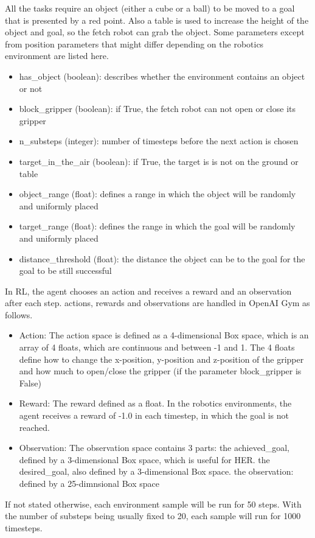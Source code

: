 \vspace{0.5cm}

All the tasks require an object (either a cube or a ball) to be moved to a goal that is presented by a red point. Also a table is used to increase the height of the object and goal, so the fetch robot can grab the object.
Some parameters except from position parameters that might differ depending on the robotics environment are listed here.

\begin{itemize}
	\item has\_object (boolean): describes whether the environment contains an object or not
	\item block\_gripper (boolean): if True, the fetch robot can not open or close its gripper
	\item n\_substeps (integer): number of timesteps before the next action is chosen
	\item target\_in\_the\_air (boolean): if True, the target is is not on the ground or table 
	\item object\_range (float): defines a range in which the object will be randomly and uniformly placed
	\item target\_range (float): defines the range in which the goal will be randomly and uniformly placed
	\item distance\_threshold (float): the distance the object can be to the goal for the goal to be still successful 
\end{itemize}

In RL, the agent chooses an action and receives a reward and an observation after each step. actions, rewards and observations are handled in OpenAI Gym as follows.

\begin{itemize}
	\item Action: The action space is defined as a 4-dimensional Box space, which is an array of 4 floats, which are continuous and between -1 and 1. The 4 floats define how to change the x-position, y-position and z-position of the gripper and how much to open/close the gripper (if the parameter block\_gripper is False)
	\item Reward: The reward defined as a float. In the robotics environments, the agent receives a reward of -1.0 in each timestep, in which the goal is not reached.
	\item Observation: The observation space contains 3 parts:
	the achieved\_goal, defined by a 3-dimensional Box space, which is useful for HER. 
	the desired\_goal, also defined by a 3-dimensional Box space.
	the observation: defined by a 25-dimnsional Box space
\end{itemize}

If not stated otherwise, each environment sample will be run for 50 steps. With the number of substeps being usually fixed to 20, each sample will run for 1000 timesteps. 


